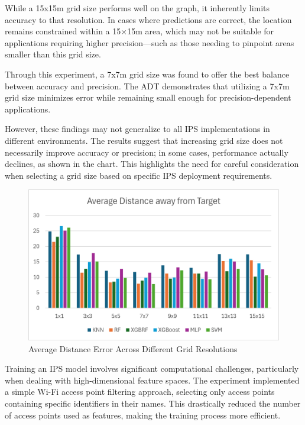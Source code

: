 \documentclass[runningheads]{llncs}
\begin{document}
While a 15x15m grid size performs well on the graph, it inherently limits accuracy to that resolution. In cases where predictions are correct, the location remains constrained within a 15×15m area, which may not be suitable for applications requiring higher precision—such as those needing to pinpoint areas smaller than this grid size.

Through this experiment, a 7x7m grid size was found to offer the best balance between accuracy and precision. The ADT demonstrates that utilizing a 7x7m grid size minimizes error while remaining small enough for precision-dependent applications. 

However, these findings may not generalize to all IPS implementations in different environments. The results suggest that increasing grid size does not necessarily improve accuracy or precision; in some cases, performance actually declines, as shown in the chart. This highlights the need for careful consideration when selecting a grid size based on specific IPS deployment requirements.



\begin{figure}[htbp]
	\centerline{\includegraphics[scale=0.65]{image2.png}}
	\caption{Average Distance Error Across Different Grid Resolutions}
	\label{fig:Avg_dis_err}
\end{figure}

Training an IPS model involves significant computational challenges, particularly when dealing with high-dimensional feature spaces. The experiment implemented a simple Wi-Fi access point filtering approach, selecting only access points containing specific identifiers in their names. This drastically reduced the number of access points used as features, making the training process more efficient.
\end{document}

